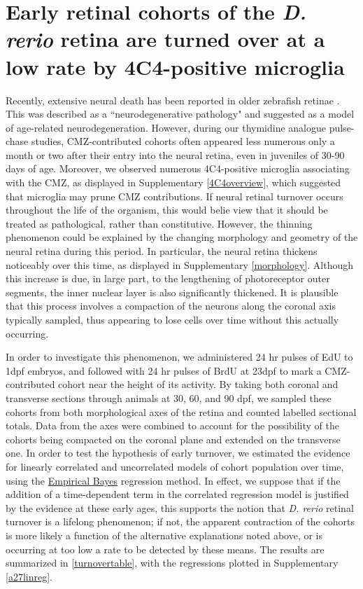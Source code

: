 \section{Early retinal cohorts of the \textit{D. rerio} retina are turned over at a low rate by 4C4-positive microglia}
\label{sec:neuralfate}
Recently, extensive neural death has been reported in older zebrafish retinae \cite{Vanhoucke2018}. This was described as a ``neurodegenerative pathology" and suggested as a model of age-related neurodegeneration. However, during our thymidine analogue pulse-chase studies, CMZ-contributed cohorts often appeared less numerous only a month or two after their entry into the neural retina, even in juveniles of 30-90 days of age. Moreover, we observed numerous 4C4-positive microglia associating with the CMZ, as displayed in Supplementary \autoref{4C4overview}, which suggested that microglia may prune CMZ contributions. If neural retinal turnover occurs throughout the life of the organism, this would belie view that it should be treated as pathological, rather than constitutive. However, the thinning phenomenon could be explained by the changing morphology and geometry of the neural retina during this period. In particular, the neural retina thickens noticeably over this time, as displayed in Supplementary \autoref{morphology}. Although this increase is due, in large part, to the lengthening of photoreceptor outer segments, the inner nuclear layer is also significantly thickened. It is plausible that this process involves a compaction of the neurons along the coronal axis typically sampled, thus appearing to lose cells over time without this actually occurring. 

In order to investigate this phenomenon, we administered 24 hr pulses of EdU to 1dpf embryos, and followed with 24 hr pulses of BrdU at 23dpf to mark a CMZ-contributed cohort near the height of its activity. By taking both coronal and transverse sections through animals at 30, 60, and 90 dpf, we sampled these cohorts from both morphological axes of the retina and counted labelled sectional totals. Data from the axes were combined to account for the possibility of the cohorts being compacted on the coronal plane and extended on the transverse one. In order to test the hypothesis of early turnover, we estimated the evidence for linearly correlated and uncorrelated models of cohort population over time, using the \hyperref[empiricalBayes]{Empirical Bayes} regression method. In effect, we suppose that if the addition of a time-dependent term in the correlated regression model is justified by the evidence at these early ages, this supports the notion that \textit{D. rerio} retinal turnover is a lifelong phenomenon; if not, the apparent contraction of the cohorts is more likely a function of the alternative explanations noted above, or is occurring at too low a rate to be detected by these means. The results are summarized in \autoref{turnovertable}, with the regressions plotted in Supplementary \autoref{a27linreg}.

